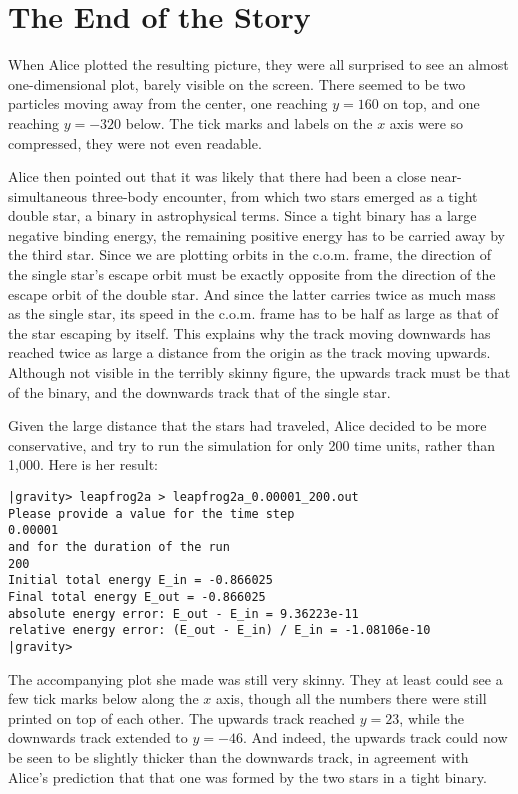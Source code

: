 \section{The End of the Story}

When Alice plotted the resulting picture, they were all surprised to
see an almost one-dimensional plot, barely visible on the screen.
There seemed to be two particles moving away from the center, one
reaching $y=160$ on top, and one reaching $y=-320$ below.  The
tick marks and labels on the $x$ axis were so compressed, they were not
even readable.

Alice then pointed out that it was likely that there had been a close
near-simultaneous three-body encounter, from which two stars emerged
as a tight double star, a binary in astrophysical terms.  Since a
tight binary has a large negative binding energy, the remaining
positive energy has to be carried away by the third star.  Since we
are plotting orbits in the c.o.m. frame, the direction of the single
star's escape orbit must be exactly opposite from the direction of the
escape orbit of the double star.  And since the latter carries twice
as much mass as the single star, its speed in the c.o.m. frame has to
be half as large as that of the star escaping by itself.  This explains
why the track moving downwards has reached twice as large a distance
from the origin as the track moving upwards.  Although not visible in
the terribly skinny figure, the upwards track must be that of the
binary, and the downwards track that of the single star.

Given the large distance that the stars had traveled, Alice decided to
be more conservative, and try to run the simulation for only 200 time
units, rather than 1,000.  Here is her result:

\begin{small}
\begin{verbatim}
|gravity> leapfrog2a > leapfrog2a_0.00001_200.out
Please provide a value for the time step
0.00001
and for the duration of the run
200
Initial total energy E_in = -0.866025
Final total energy E_out = -0.866025
absolute energy error: E_out - E_in = 9.36223e-11
relative energy error: (E_out - E_in) / E_in = -1.08106e-10
|gravity>
\end{verbatim}
\end{small}

The accompanying plot she made was still very skinny.  They at least
could see a few tick marks below along the $x$ axis, though all the
numbers there were still printed on top of each other.  The upwards
track reached $y=23$, while the downwards track extended to $y=-46$.
And indeed, the upwards track could now be seen to be slightly thicker
than the downwards track, in agreement with Alice's prediction that
that one was formed by the two stars in a tight binary.

